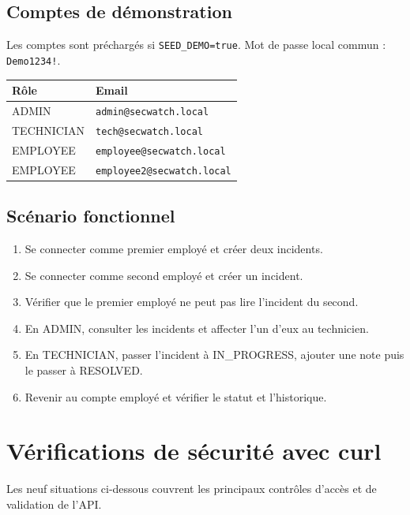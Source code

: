 \documentclass[12pt,a4paper,oneside]{report}
\begin{document}
\section{Comptes de démonstration}
Les comptes sont préchargés si \texttt{SEED\_DEMO=true}. Mot de passe local commun : \texttt{Demo1234!}.
\begin{center}
\begin{tabular}{ll}
\toprule
Rôle & Email\\
\midrule
ADMIN & \texttt{admin@secwatch.local}\\
TECHNICIAN & \texttt{tech@secwatch.local}\\
EMPLOYEE & \texttt{employee@secwatch.local}\\
EMPLOYEE & \texttt{employee2@secwatch.local}\\
\bottomrule
\end{tabular}
\end{center}

\section{Scénario fonctionnel}
\begin{enumerate}
  \item Se connecter comme premier employé et créer deux incidents.
  \item Se connecter comme second employé et créer un incident.
  \item Vérifier que le premier employé ne peut pas lire l'incident du second.
  \item En ADMIN, consulter les incidents et affecter l'un d'eux au technicien.
  \item En TECHNICIAN, passer l'incident à IN\_PROGRESS, ajouter une note puis le passer à RESOLVED.
  \item Revenir au compte employé et vérifier le statut et l'historique.
\end{enumerate}

\chapter{Vérifications de sécurité avec curl}
Les neuf situations ci-dessous couvrent les principaux contrôles d'accès et de validation de l'API.
\end{document}
